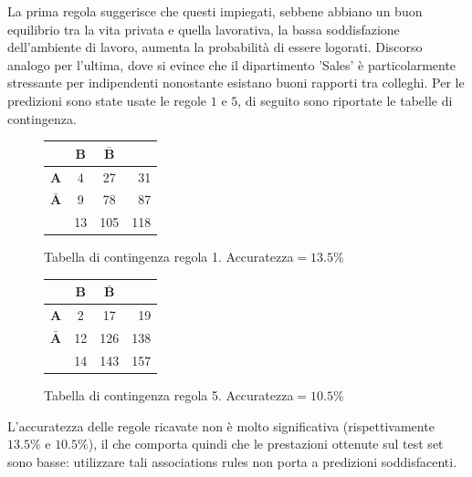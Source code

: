 \documentclass[a4paper,9pt]{article}
\begin{document}
La prima regola suggerisce che questi impiegati, sebbene abbiano un buon equilibrio tra la vita privata e quella lavorativa, la bassa soddisfazione dell'ambiente di lavoro, aumenta la probabilità di essere logorati. Discorso analogo per l'ultima, dove si evince che il dipartimento 'Sales' è particolarmente stressante per indipendenti nonostante esistano buoni rapporti tra colleghi.
Per le predizioni sono state usate le regole $1$ e $5$, di seguito sono riportate le tabelle di contingenza.

\begin{figure}[H]
  \centering
  \begin{minipage}{.45\textwidth}
    \centering
    \begin{tabular}{l|cc|r}
& \bfseries B & $\bar{\textbf {B}}$ &\\
\hline
\bfseries A & 4 & 27 &31\\
 $\bar{\textbf {A}}$ & 9&78&87\\
\hline
& 13&105&118\\
\end{tabular}
    \caption{Tabella di contingenza regola 1. Accuratezza$=13.5\%$}
  \end{minipage}
  \begin{minipage}{.45\textwidth}
    \centering
    \begin{tabular}{l|cc|r}
& \bfseries B &  $\bar{\textbf {B}}$ &\\
\hline
\bfseries A & 2& 17 &19\\
 $\bar{\textbf {A}}$ & 12&126&138\\
\hline
& 14&143&157\\
\end{tabular}
    \caption{Tabella di contingenza regola 5.  Accuratezza$=10.5\%$}
  \end{minipage}
  \end{figure}
L'accuratezza delle regole ricavate non è molto significativa (rispettivamente $13.5\%$ e $10.5\%$), il che comporta quindi che le prestazioni ottenute sul test set sono basse: utilizzare tali associations rules non porta a predizioni soddisfacenti.
\end{document}
